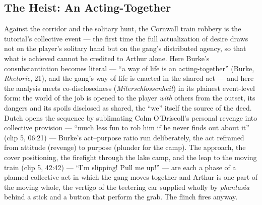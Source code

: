 \bigskip

\subsection*{The Heist: An Acting-Together}

Against the corridor and the solitary hunt, the Cornwall train robbery is the tutorial's collective event — the first time the full actualization of desire draws not on the player's solitary hand but on the gang's distributed agency, so that what is achieved cannot be credited to Arthur alone. Here Burke's consubstantiation becomes literal — ``a way of life is an acting-together'' (Burke, \textit{Rhetoric}, 21), and the gang's way of life is enacted in the shared act — and here the analysis meets co-disclosedness (\textit{Miterschlossenheit}) in its plainest event-level form: the world of the job is opened to the player \textit{with} others from the outset, its dangers and its spoils disclosed as shared, the ``we'' itself the source of the deed. Dutch opens the sequence by sublimating Colm O'Driscoll's personal revenge into collective provision — ``much less fun to rob him if he never finds out about it'' (clip 5, 06:21) — Burke's act–purpose ratio run deliberately, the act reframed from attitude (revenge) to purpose (plunder for the camp). The approach, the cover positioning, the firefight through the lake camp, and the leap to the moving train (clip 5, 42:42) — ``I'm slipping! Pull me up!'' — are each a phase of a planned collective act in which the gang moves together and Arthur is one part of the moving whole, the vertigo of the teetering car supplied wholly by \textit{phantasia} behind a stick and a button that perform the grab. The flinch fires anyway.

